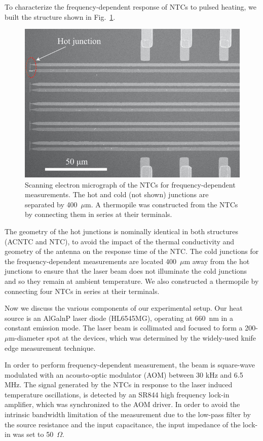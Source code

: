 \documentclass[journal]{IEEEtran}
\begin{document}
To characterize the frequency-dependent response of NTCs to pulsed heating, we built the structure shown in Fig.~\ref{fig3}. 
%
\begin{figure}[h]
\centerline{\includegraphics[width=1.0\columnwidth,clip]{figures/Fig3}}
\caption{Scanning electron micrograph of the NTCs for frequency-dependent measurements. The hot and cold (not shown) junctions are separated by 400~$\mu$m. A thermopile was constructed from the NTCs by connecting them in series at their terminals.}
\label{fig3}
\end{figure}
%
The geometry of the hot junctions is nominally identical in both structures (ACNTC and NTC), to avoid the impact of the thermal conductivity and geometry of the antenna on the response time of the NTC. The cold junctions for the frequency-dependent measurements are located 400~$\mu$m away from the hot junctions to ensure that the laser beam does not illuminate the cold junctions and so they remain at ambient temperature.
We also constructed a thermopile by connecting four NTCs in series at their terminals.

Now we discuss the various components of our experimental setup. Our heat source is an AlGalnP laser diode (HL6545MG), operating at 660~nm in a constant emission mode. The laser beam is collimated and focused to form a
200-$\mu$m-diameter spot at the devices, which was determined
by the widely-used knife edge measurement technique. 

In order to perform frequency-dependent measurement, the beam is square-wave modulated with an acousto-optic modulator (AOM) between 30 kHz and 6.5 MHz. The signal generated by the NTCs in response to the laser induced temperature oscillations, is detected by an SR844 high frequency lock-in amplifier, which was synchronized to the AOM driver. In order to avoid the intrinsic bandwidth limitation of the measurement due to the low-pass filter by the source resistance and the input capacitance, the input impedance of the lock-in was set to 50~$\Omega$. 
\end{document}
